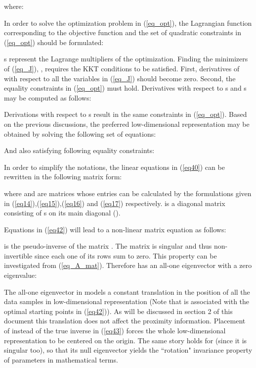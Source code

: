 \documentclass[10pt,journal,cspaper,compsoc]{IEEEtran}
\begin{document}
where:


In order to solve the optimization problem in (\ref{eq_opt}), the Lagrangian function corresponding to the objective function  and the set of quadratic constraints in (\ref{eq_opt}) should be formulated:


s represent the Lagrange multipliers of the optimization. Finding the minimizers of (\ref{eq_J}), , requires the KKT conditions to be satisfied. First, derivatives of  with respect to all the variables in (\ref{eq_J}) should become zero. Second, the equality constraints in (\ref{eq_opt}) must hold. Derivatives with respect to s and s may be computed as follows:




Derivations with respect to s result in the same constraints in (\ref{eq_opt}). Based on the previous discussions, the preferred low-dimensional representation may be obtained by solving the following set of equations:


And also satisfying following equality constraints:


In order to simplify the notations, the linear equations in (\ref{eq40}) can be rewritten in the following matrix form:

where  and  are  matrices whose entries can be calculated by the formulations given in (\ref{eq14}),(\ref{eq15}),(\ref{eq16}) and (\ref{eq17}) respectively.  is a  diagonal matrix consisting of s on its main diagonal ().



Equations in (\ref{eq42}) will lead to a non-linear matrix equation as follows:


 is the pseudo-inverse of the matrix . The matrix  is singular and thus non-invertible since each one of its rows sum to zero. This property can be investigated from (\ref{eq_A_mat}). Therefore  has an all-one  eigenvector with a zero eigenvalue:
 

The all-one eigenvector in  models a constant translation in the position of all the data samples in low-dimensional representation (Note that  is associated with the optimal starting points  in (\ref{eq42})). As will be discussed in section 2 of this document this translation does not affect the proximity information. Placement of  instead of the true inverse  in (\ref{eq43}) forces the whole low-dimensional representation to be centered on the origin. The same story holds for  (since it is singular too), so that its null eigenvector yields the ``rotation" invariance property of parameters in mathematical terms.
\end{document}
